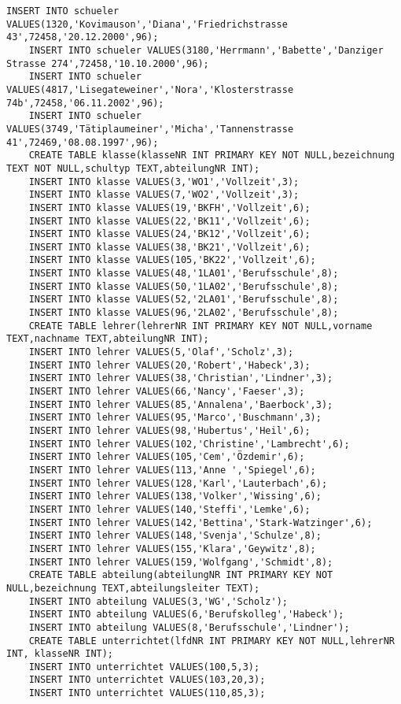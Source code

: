 \begin{lstlisting}[breaklines=True, numbers=none, basicstyle=\tiny, keepspaces=false]
	INSERT INTO schueler VALUES(1320,'Kovimauson','Diana','Friedrichstrasse 43',72458,'20.12.2000',96);
	INSERT INTO schueler VALUES(3180,'Herrmann','Babette','Danziger Strasse 274',72458,'10.10.2000',96);
	INSERT INTO schueler VALUES(4817,'Lisegateweiner','Nora','Klosterstrasse 74b',72458,'06.11.2002',96);
	INSERT INTO schueler VALUES(3749,'Tätiplaumeiner','Micha','Tannenstrasse 41',72469,'08.08.1997',96);
	CREATE TABLE klasse(klasseNR INT PRIMARY KEY NOT NULL,bezeichnung TEXT NOT NULL,schultyp TEXT,abteilungNR INT);
	INSERT INTO klasse VALUES(3,'WO1','Vollzeit',3);
	INSERT INTO klasse VALUES(7,'WO2','Vollzeit',3);
	INSERT INTO klasse VALUES(19,'BKFH','Vollzeit',6);
	INSERT INTO klasse VALUES(22,'BK11','Vollzeit',6);
	INSERT INTO klasse VALUES(24,'BK12','Vollzeit',6);
	INSERT INTO klasse VALUES(38,'BK21','Vollzeit',6);
	INSERT INTO klasse VALUES(105,'BK22','Vollzeit',6);
	INSERT INTO klasse VALUES(48,'1LA01','Berufsschule',8);
	INSERT INTO klasse VALUES(50,'1LA02','Berufsschule',8);
	INSERT INTO klasse VALUES(52,'2LA01','Berufsschule',8);
	INSERT INTO klasse VALUES(96,'2LA02','Berufsschule',8);
	CREATE TABLE lehrer(lehrerNR INT PRIMARY KEY NOT NULL,vorname TEXT,nachname TEXT,abteilungNR INT);
	INSERT INTO lehrer VALUES(5,'Olaf','Scholz',3);
	INSERT INTO lehrer VALUES(20,'Robert','Habeck',3);
	INSERT INTO lehrer VALUES(38,'Christian','Lindner',3);
	INSERT INTO lehrer VALUES(66,'Nancy','Faeser',3);
	INSERT INTO lehrer VALUES(85,'Annalena','Baerbock',3);
	INSERT INTO lehrer VALUES(95,'Marco','Buschmann',3);
	INSERT INTO lehrer VALUES(98,'Hubertus','Heil',6);
	INSERT INTO lehrer VALUES(102,'Christine','Lambrecht',6);
	INSERT INTO lehrer VALUES(105,'Cem','Özdemir',6);
	INSERT INTO lehrer VALUES(113,'Anne ','Spiegel',6);
	INSERT INTO lehrer VALUES(128,'Karl','Lauterbach',6);
	INSERT INTO lehrer VALUES(138,'Volker','Wissing',6);
	INSERT INTO lehrer VALUES(140,'Steffi','Lemke',6);
	INSERT INTO lehrer VALUES(142,'Bettina','Stark-Watzinger',6);
	INSERT INTO lehrer VALUES(148,'Svenja','Schulze',8);
	INSERT INTO lehrer VALUES(155,'Klara','Geywitz',8);
	INSERT INTO lehrer VALUES(159,'Wolfgang','Schmidt',8);
	CREATE TABLE abteilung(abteilungNR INT PRIMARY KEY NOT NULL,bezeichnung TEXT,abteilungsleiter TEXT);
	INSERT INTO abteilung VALUES(3,'WG','Scholz');
	INSERT INTO abteilung VALUES(6,'Berufskolleg','Habeck');
	INSERT INTO abteilung VALUES(8,'Berufsschule','Lindner');
	CREATE TABLE unterrichtet(lfdNR INT PRIMARY KEY NOT NULL,lehrerNR INT, klasseNR INT);
	INSERT INTO unterrichtet VALUES(100,5,3);
	INSERT INTO unterrichtet VALUES(103,20,3);
	INSERT INTO unterrichtet VALUES(110,85,3);

\end{lstlisting}
